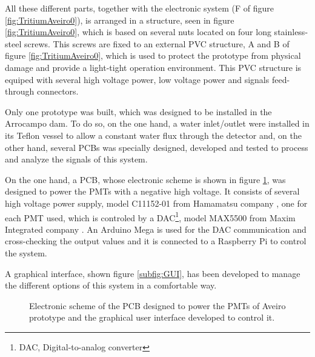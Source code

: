 All these different parts, together with the electronic system (F of figure \ref{fig:TritiumAveiro0}), is arranged in a structure, seen in figure \ref{fig:TritiumAveiro0}, which is based on several nuts located on four long stainless-steel screws. This screws are fixed to an external PVC structure, A and B of figure \ref{fig:TritiumAveiro0}, which is used to protect the prototype from physical damage and provide a light-tight operation environment. This PVC structure is equiped with several high voltage power, low voltage power and signals feed-through connectors.

Only one prototype was built, which was designed to be installed in the Arrocampo dam. To do so, on the one hand, a water inlet/outlet were installed in its Teflon vessel to allow a constant water flux through the detector and, on the other hand, several PCBs was specially designed, developed and tested to process and analyze the signals of this system.

On the one hand, a PCB, whose electronic scheme is shown in figure \ref{fig:HVElectronicAveiro}, was designed to power the PMTs with a negative high voltage. It consists of several high voltage power supply, model C11152-01 from Hamamatsu company \cite{PowerSupplyAveiroDataSheet}, one for each PMT used, which is controled by a DAC\footnote{DAC, Digital-to-analog converter}, model MAX5500 from Maxim Integrated company \cite{MAX5500DataSheet}. An Arduino Mega is used for the DAC communication and cross-checking the output values and it is connected to a Raspberry Pi to control the system.

A graphical interface, shown figure \ref{subfig:GUI}, has been developed to manage the different options of this system in a comfortable way.

\begin{figure}[h]
 \centering
 \caption{Electronic scheme of the PCB designed to power the PMTs of Aveiro prototype and the graphical user interface developed to control it.}
 \label{fig:HVElectronicAveiro}
\end{figure}

